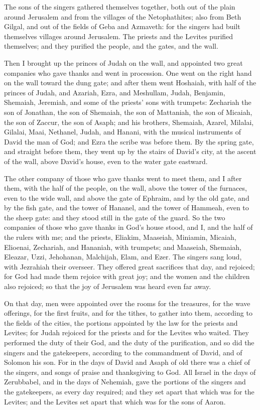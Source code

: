 {The sons of the singers gathered themselves together, both out of the plain around Jerusalem and from the villages of the Netophathites;
also from Beth Gilgal, and out of the fields of Geba and Azmaveth: for the singers had built themselves villages around Jerusalem.
The priests and the Levites purified themselves; and they purified the people, and the gates, and the wall.
\par }{\PP {}Then I brought up the princes of Judah on the wall, and appointed two great companies who gave thanks and went in procession. One went on the right hand on the wall toward the dung gate;
and after them went Hoshaiah, with half of the princes of Judah,
and Azariah, Ezra, and Meshullam,
Judah, Benjamin, Shemaiah, Jeremiah,
and some of the priests’ sons with trumpets: Zechariah the son of Jonathan, the son of Shemaiah, the son of Mattaniah, the son of Micaiah, the son of Zaccur, the son of Asaph;
and his brothers, Shemaiah, Azarel, Milalai, Gilalai, Maai, Nethanel, Judah, and Hanani, with the musical instruments of David the man of God; and Ezra the scribe was before them.
By the spring gate, and straight before them, they went up by the stairs of David’s city, at the ascent of the wall, above David’s house, even to the water gate eastward.
\par }{\PP {}The other company of those who gave thanks went to meet them, and I after them, with the half of the people, on the wall, above the tower of the furnaces, even to the wide wall,
and above the gate of Ephraim, and by the old gate, and by the fish gate, and the tower of Hananel, and the tower of Hammeah, even to the sheep gate: and they stood still in the gate of the guard.
So the two companies of those who gave thanks in God’s house stood, and I, and the half of the rulers with me;
and the priests, Eliakim, Maaseiah, Miniamin, Micaiah, Elioenai, Zechariah, and Hananiah, with trumpets;
and Maaseiah, Shemaiah, Eleazar, Uzzi, Jehohanan, Malchijah, Elam, and Ezer. The singers sang loud, with Jezrahiah their overseer.
They offered great sacrifices that day, and rejoiced; for God had made them rejoice with great joy; and the women and the children also rejoiced; so that the joy of Jerusalem was heard even far away.
\par }{\PP {}On that day, men were appointed over the rooms for the treasures, for the wave offerings, for the first fruits, and for the tithes, to gather into them, according to the fields of the cities, the portions appointed by the law for the priests and Levites; for Judah rejoiced for the priests and for the Levites who waited.
They performed the duty of their God, and the duty of the purification, and so did the singers and the gatekeepers, according to the commandment of David, and of Solomon his son.
For in the days of David and Asaph of old there was a chief of the singers, and songs of praise and thanksgiving to God.
All Israel in the days of Zerubbabel, and in the days of Nehemiah, gave the portions of the singers and the gatekeepers, as every day required; and they set apart that which was for the Levites; and the Levites set apart that which was for the sons of Aaron.

}
